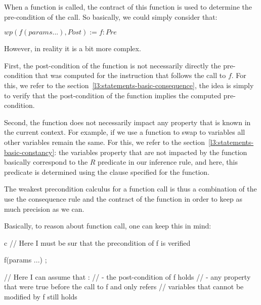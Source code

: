 
When a function is called, the contract of this function is used to determine
the pre-condition of the call. So basically, we could simply consider that:


\begin{center}
$wp( f(params ...), Post ) := f:Pre$
\end{center}


However, in reality it is a bit more complex.


First, the post-condition of the function is not necessarily directly the
pre-condition that was computed for the instruction that follows the call to
$f$. For this, we refer to the section~\ref{l3:statements-basic-consequence},
the idea is simply to verify that the post-condition of the function implies
the computed pre-condition.



Second, the function does not necessarily impact any property that is known in
the current context. For example, if we use a function to swap to variables all
other variables remain the same. For this, we refer to the
section~\ref{l3:statements-basic-constancy}: the variables property that are
not impacted by the function basically correspond to the $R$ predicate in our
inference rule, and here, this predicate is determined using the
 clause specified for the function.



The weakest precondition calculus for a function call is thus a combination of
the use the consequence rule and the contract of the function in order to keep
as much precision as we can.



Basically, to reason about function call, one can keep this in mind:



\begin{CodeBlock}{c}
  // Here I must be sur that the precondition of f is verified
  
  f(params ...) ;

  // Here I can assume that :
  // - the post-condition of f holds
  // - any property that were true before the call to f and only refers
  //   variables that cannot be modified by f still holds
\end{CodeBlock}





